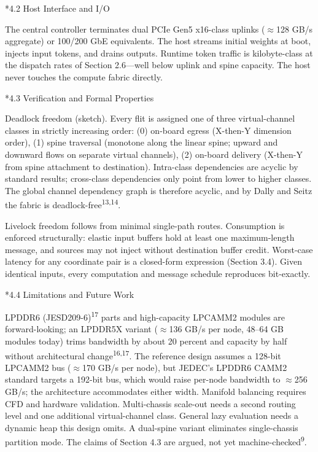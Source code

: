 \documentclass[12pt]{article}
\makeatletter
\renewcommand\subsection{\@startsection{subsection}{2}{\z@}{-1.0ex \@plus -0.2ex}{0.3ex}{\normalsize\bfseries}}
\makeatother
\begin{document}
\subsection*{4.2 Host Interface and I/O}

The central controller terminates dual PCIe Gen5 x16-class uplinks ($\approx$128 GB/s aggregate) or 100/200 GbE equivalents. The host streams initial weights at boot, injects input tokens, and drains outputs. Runtime token traffic is kilobyte-class at the dispatch rates of Section 2.6---well below uplink and spine capacity. The host never touches the compute fabric directly.

\subsection*{4.3 Verification and Formal Properties}

Deadlock freedom (sketch). Every flit is assigned one of three virtual-channel classes in strictly increasing order: (0) on-board egress (X-then-Y dimension order), (1) spine traversal (monotone along the linear spine; upward and downward flows on separate virtual channels), (2) on-board delivery (X-then-Y from spine attachment to destination). Intra-class dependencies are acyclic by standard results; cross-class dependencies only point from lower to higher classes. The global channel dependency graph is therefore acyclic, and by Dally and Seitz the fabric is deadlock-free\textsuperscript{13,14}.

Livelock freedom follows from minimal single-path routes. Consumption is enforced structurally: elastic input buffers hold at least one maximum-length message, and sources may not inject without destination buffer credit. Worst-case latency for any coordinate pair is a closed-form expression (Section 3.4). Given identical inputs, every computation and message schedule reproduces bit-exactly.

\subsection*{4.4 Limitations and Future Work}

LPDDR6 (JESD209-6)\textsuperscript{17} parts and high-capacity LPCAMM2 modules are forward-looking; an LPDDR5X variant ($\approx$136 GB/s per node, 48--64 GB modules today) trims bandwidth by about 20 percent and capacity by half without architectural change\textsuperscript{16,17}. The reference design assumes a 128-bit LPCAMM2 bus ($\approx$170 GB/s per node), but JEDEC's LPDDR6 CAMM2 standard targets a 192-bit bus, which would raise per-node bandwidth to $\approx$256 GB/s; the architecture accommodates either width. Manifold balancing requires CFD and hardware validation. Multi-chassis scale-out needs a second routing level and one additional virtual-channel class. General lazy evaluation needs a dynamic heap this design omits. A dual-spine variant eliminates single-chassis partition mode. The claims of Section 4.3 are argued, not yet machine-checked\textsuperscript{9}.
\end{document}
